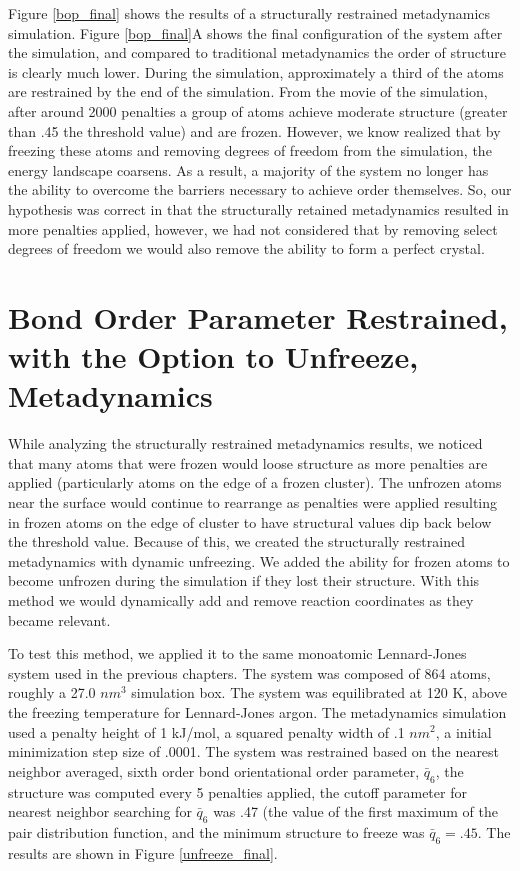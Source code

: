 Figure \ref{bop_final} shows the results of a structurally restrained metadynamics simulation.  Figure \ref{bop_final}A shows the final configuration of the system after the simulation, and compared to traditional metadynamics the order of structure is clearly much lower.  During the simulation, approximately a third of the atoms are restrained by the end of the simulation.  From the movie of the simulation, after around 2000 penalties a group of atoms achieve moderate structure (greater than .45 the threshold value) and are frozen.  However, we know realized that by freezing these atoms and removing degrees of freedom from the simulation, the energy landscape coarsens.  As a result, a majority of the system no longer has the ability to overcome the barriers necessary to achieve order themselves.  So, our hypothesis was correct in that the structurally retained metadynamics resulted in more penalties applied, however, we had not considered that by removing select degrees of freedom we would also remove the ability to form a perfect crystal.  

\section{Bond Order Parameter Restrained, with the Option to Unfreeze, Metadynamics}
While analyzing the structurally restrained metadynamics results, we noticed that many atoms that were frozen would loose structure as more penalties are applied (particularly atoms on the edge of a frozen cluster).  The unfrozen atoms near the surface would continue to rearrange as penalties were applied resulting in frozen atoms on the edge of cluster to have structural values dip back below the threshold value.  Because of this, we created the structurally restrained metadynamics with dynamic unfreezing.  We added the ability for frozen atoms to become unfrozen during the simulation if they lost their structure.  With this method we would dynamically add and remove reaction coordinates as they became relevant.

To test this method, we applied it to the same monoatomic Lennard-Jones system used in the previous chapters.  The system was composed of 864 atoms, roughly a 27.0 $nm^3$ simulation box.  The system was equilibrated at 120 K, above the freezing temperature for Lennard-Jones argon.  The metadynamics simulation used a penalty height of 1 kJ/mol, a squared penalty width of .1 $nm^2$, a initial minimization step size of .0001.  The system was restrained based on the nearest neighbor averaged, sixth order bond orientational order parameter, $\bar{q}_6$, the structure was computed every 5 penalties applied, the cutoff parameter for nearest neighbor searching for $\bar{q}_6$ was .47 (the value of the first maximum of the pair distribution function, and the minimum structure to freeze was $\bar{q}_6 = .45$.  The results are shown in Figure \ref{unfreeze_final}. 


